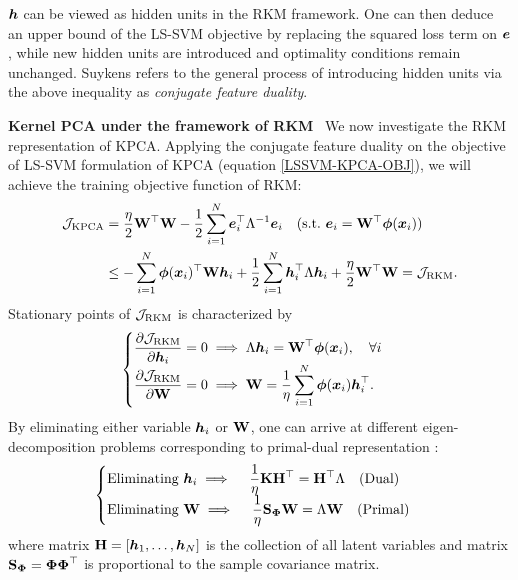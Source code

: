 $\boldsymbol{h}$ can be viewed as hidden units in the RKM framework. One can then deduce an upper bound of the LS-SVM objective by replacing the squared loss term on $\boldsymbol{e}$, while new hidden units are introduced and optimality conditions remain unchanged. Suykens refers to the general process of introducing hidden units via the above inequality as \emph{conjugate feature duality}.

\noindent\textbf{Kernel PCA under the framework of RKM} \ We now investigate the RKM representation of KPCA. Applying the conjugate feature duality on the objective of LS-SVM formulation of KPCA (equation \ref{LSSVM-KPCA-OBJ}), we will achieve the training objective function of RKM:
\begin{equation}
    \begin{aligned}
        \mathcal{J}_{\text{KPCA}} &= \frac{\eta}{2}\mathbf{W}^\top\mathbf{W} - \frac{1}{2}\sum_{i=1}^{N}\boldsymbol{e}_{i}^\top \Lambda^{-1} \boldsymbol{e}_{i} \quad (\text{s.t.} \ \boldsymbol{e}_i = \mathbf{W}^\top \boldsymbol{\phi}(\boldsymbol{x}_i))  \\
& \leq -\sum_{i=1}^{N}\boldsymbol{\phi}(\boldsymbol{x}_i)^\top\mathbf{W}\boldsymbol{h}_i + \frac{1}{2}\sum_{i=1}^{N}\boldsymbol{h}_i^\top\Lambda\boldsymbol{h}_i + \frac{\eta}{2}\mathbf{W}^\top\mathbf{W} = \mathcal{J}_{\text{RKM}}.
\label{RKM-KPCA-OBJ}
    \end{aligned}
\end{equation}
Stationary points of $\mathcal{J}_{\text{RKM}}$ is characterized by
\begin{equation}
    \begin{cases}
    \displaystyle
\frac{\partial \mathcal{J}_\text{RKM}}{\partial \boldsymbol{h}_i} = 0 \implies \Lambda \boldsymbol{h}_i = \mathbf{W}^\top \boldsymbol{\phi}(\boldsymbol{x}_i), \quad \forall i \\
    \displaystyle
    \frac{\partial \mathcal{J}_\text{RKM}}{\partial \mathbf{W}} = 0 \implies \mathbf{W} = \frac{1}{\eta} \sum_{i=1}^N \boldsymbol{\phi}(\boldsymbol{x}_i) \boldsymbol{h}_i^\top. \\
\end{cases}
\end{equation}
By eliminating either variable $\boldsymbol{h}_i$ or $\mathbf{W}$, one can arrive at different eigen-decomposition problems corresponding to primal-dual representation :
\begin{equation}
    \begin{cases}
        \displaystyle
    \text{Eliminating $\boldsymbol{h}_i$} \implies \quad \frac{1}{\eta}\mathbf{K}\mathbf{H}^\top = \mathbf{H}^\top\Lambda \quad \text{(Dual)}  \\
    \displaystyle
    \text{Eliminating $\mathbf{W}$} \implies \quad \frac{1}{\eta}\mathbf{S}_{\boldsymbol{\Phi}}\mathbf{W} = \Lambda\mathbf{W}  \quad \text{(Primal)}
    \end{cases}
    \label{RKM-KPCA-primal-dual}
\end{equation}
where matrix $\mathbf{H} = [\boldsymbol{h}_1,\dots,\boldsymbol{h}_N]$ is the collection of all latent variables and matrix $\mathbf{S}_{\boldsymbol{\Phi}} = \boldsymbol{\Phi}\boldsymbol{\Phi}^{\top}$ is proportional to the sample covariance matrix. 

